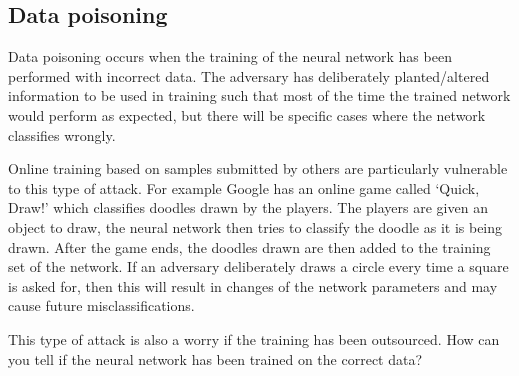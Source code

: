 \subsection{Data poisoning}

Data poisoning occurs when the training of the neural network has been performed with incorrect data. The adversary has deliberately planted/altered information to be used in training such that most of the time the trained network would perform as expected, but there will be specific cases where the network classifies wrongly.

Online training based on samples submitted by others are particularly vulnerable to this type of attack. For example Google has an online game called `Quick, Draw!' which classifies doodles drawn by the players. The players are given an object to draw, the neural network then tries to classify the doodle as it is being drawn. After the game ends, the doodles drawn are then added to the training set of the network. If an adversary deliberately draws a circle every time a square is asked for, then this will result in changes of the network parameters and may cause future misclassifications. 

This type of attack is also a worry if the training has been outsourced. How can you tell if the neural network has been trained on the correct data?

